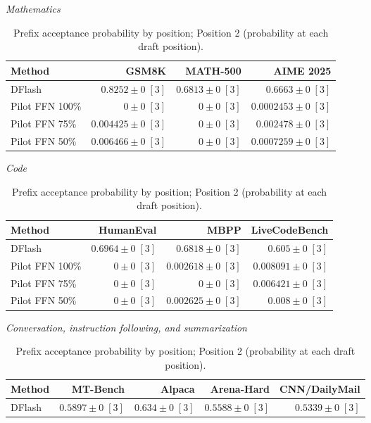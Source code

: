 \begin{table}[!htp]
\centering\small
\setlength{\tabcolsep}{3pt}
\caption{Prefix acceptance probability by position; Position 2 (probability at each draft position).}
\label{tab:appendix-metric-prefix-survival-2}
\textit{Mathematics}\par\smallskip
\begin{tabular}{@{}>{\raggedright\arraybackslash}p{3.7cm}rrr@{}}
\toprule
Method & GSM8K & MATH-500 & AIME 2025 \\
\midrule
DFlash & \(\mathbf{0.8252} \pm 0\;[3]\) & \(\mathbf{0.6813} \pm 0\;[3]\) & \(\mathbf{0.6663} \pm 0\;[3]\) \\
Pilot FFN 100\% & \(0 \pm 0\;[3]\) & \(0 \pm 0\;[3]\) & \(0.0002453 \pm 0\;[3]\) \\
Pilot FFN 75\% & \(0.004425 \pm 0\;[3]\) & \(0 \pm 0\;[3]\) & \(0.002478 \pm 0\;[3]\) \\
Pilot FFN 50\% & \(0.006466 \pm 0\;[3]\) & \(0 \pm 0\;[3]\) & \(0.0007259 \pm 0\;[3]\) \\
\bottomrule
\end{tabular}\par\medskip
\textit{Code}\par\smallskip
\begin{tabular}{@{}>{\raggedright\arraybackslash}p{3.7cm}rrr@{}}
\toprule
Method & HumanEval & MBPP & LiveCodeBench \\
\midrule
DFlash & \(\mathbf{0.6964} \pm 0\;[3]\) & \(\mathbf{0.6818} \pm 0\;[3]\) & \(\mathbf{0.605} \pm 0\;[3]\) \\
Pilot FFN 100\% & \(0 \pm 0\;[3]\) & \(0.002618 \pm 0\;[3]\) & \(0.008091 \pm 0\;[3]\) \\
Pilot FFN 75\% & \(0 \pm 0\;[3]\) & \(0 \pm 0\;[3]\) & \(0.006421 \pm 0\;[3]\) \\
Pilot FFN 50\% & \(0 \pm 0\;[3]\) & \(0.002625 \pm 0\;[3]\) & \(0.008 \pm 0\;[3]\) \\
\bottomrule
\end{tabular}\par\medskip
\textit{Conversation, instruction following, and summarization}\par\smallskip
\begin{tabular}{@{}>{\raggedright\arraybackslash}p{3.7cm}rrrr@{}}
\toprule
Method & MT-Bench & Alpaca & Arena-Hard & CNN/DailyMail \\
\midrule
DFlash & \(\mathbf{0.5897} \pm 0\;[3]\) & \(\mathbf{0.634} \pm 0\;[3]\) & \(\mathbf{0.5588} \pm 0\;[3]\) & \(\mathbf{0.5339} \pm 0\;[3]\) \\

\end{tabular}
\end{table}

